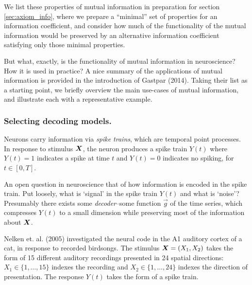 \documentclass[12pt]{article}
\begin{document}
We list these properties of mutual information in preparation for
section \ref{sec:axiom_info}, where we prepare a ``minimal'' set of
properties for an information coefficient, and consider how much of
the functionality of the mutual information would be preserved by an
alternative information coefficient satisfying only those minimal
properties.

But what, exactly, is the functionality of mutual information in
neuroscience?  How it is used in practice?  A nice summary of the
applications of mutual information is provided in the introduction of
Gastpar (2014).  Taking their list as a starting point, we briefly
overview the main use-cases of mutual information, and illustrate each
with a representative example.

\subsubsection{Selecting decoding models.}
Neurons carry information via \emph{spike trains}, which are temporal
point processes.  In response to stimulus $\boldsymbol{X}$, the neuron produces a
spike train $Y(t)$ where $Y(t) = 1$ indicates a spike at time $t$ and
$Y(t) = 0$ indicates no spiking, for $t \in [0, T]$.

An open question in neuroscience that of how information is encoded in
the spike train.  Put loosely, what is `signal' in the spike train
$Y(t)$ and what is `noise'?  Presumably there exists
some \emph{decoder}--some function $\vec{g}$ of the time series, which
compresses $Y(t)$ to a small dimension while preserving most of the
information about $\boldsymbol{X}$.

Nelken et. al. (2005) investigated the neural code in the A1 auditory
cortex of a cat, in response to recorded birdsongs.  The stimulus $\boldsymbol{X}
= (X_1, X_2)$ takes the form of 15 different auditory recordings
presented in 24 spatial directions: $X_1 \in \{1,\hdots, 15\}$ indexes
the recording and $X_2 \in \{1,\hdots, 24\}$ indexes the direction of
presentation.  The response $Y(t)$ takes the form of a spike train.

\end{document}
